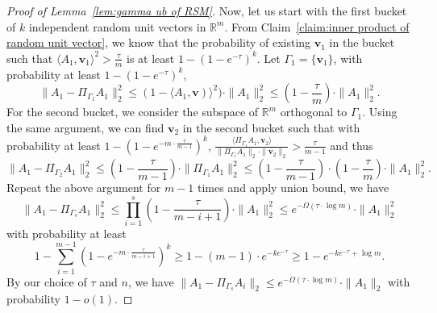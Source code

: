 \documentclass[11pt]{article}
\theoremstyle{remark}
\theoremstyle{definition}
\newcommand{\bv}{\mathbf{v}}
\newcommand{\R}{{\mathbb R}} %
\begin{document}
\begin{proof}[Proof of Lemma~\ref{lem:gamma ub of RSM}]
	Now, let us start with the first bucket of $k$ independent random unit vectors in $\R^m$. From Claim~\ref{claim:inner product of random unit vector}, we know that the probability of existing $\bv_1$ in the bucket such that $\langle A_1,\bv_1\rangle^2>\frac{\tau}{m}$ is at least $1-(1-e^{-\tau})^k$. Let $\Gamma_1=\{\bv_1\}$, with probability at least $1-(1-e^{-\tau})^k$, 
	$$\|A_1-\Pi_{\Gamma_1}A_1\|_2^2\leq(1-\langle A_1,\bv)\rangle^2)\cdot\|A_1\|_2^2\leq(1-\frac{\tau}{m})\cdot\|A_1\|_2^2.$$
	For the second bucket, we consider the subspace of $\R^m$ orthogonal to $\Gamma_1$. Using the same argument, we can find $\bv_2$ in the second bucket such that with probability at least $1-(1-e^{-m\cdot\frac{\tau}{m-1}})^k$, $\frac{\langle \Pi_{\Gamma_1}A_1,\bv_2\rangle}{\|\Pi_{\Gamma_1}A_1\|_2\cdot\|\bv_2\|_2}>\frac{\tau}{m-1}$ and thus 
	$$\|A_1-\Pi_{\Gamma_2}A_1\|_2^2\leq(1-\frac{\tau}{m-1})\cdot\|\Pi_{\Gamma_1}A_1\|_2^2\leq(1-\frac{\tau}{m-1})\cdot(1-\frac{\tau}{m})\cdot\|A_1\|_2^2.$$
	Repeat the above argument for $m-1$ times and apply union bound, we have
	$$
	\|A_1-\Pi_{\Gamma_s}A_1\|_2^2\leq\prod_{i=1}^s(1-\frac{\tau}{m-i+1})\cdot\|A_1\|_2^2\leq e^{-\Omega(\tau\cdot\log m)}\cdot\|A_1\|_2^2
	$$
	with probability at least
	$$1-\sum_{i=1}^{m-1}(1-e^{-m\cdot\frac{\tau}{m-i+1}})^k\geq1-(m-1)\cdot e^{-ke^{-\tau}}\geq1-e^{-ke^{-\tau}+\log m}.$$
	By our choice of $\tau$ and $n$, we have $\|A_1-\Pi_{\Gamma_s}A_i\|_2\leq e^{-\Omega(\tau\cdot\log m)}\cdot\|A_1\|_2$ with probability $1-o(1)$.
\end{proof}
\end{document}
